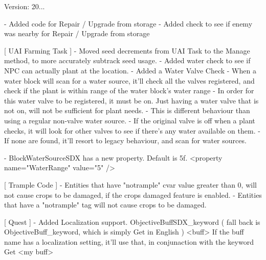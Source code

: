 Version\+: 20... \begin{DoxyVerb}
    - Added code for Repair / Upgrade from storage
    - Added check to see if enemy was nearby for Repair / Upgrade from storage

[ UAI Farming Task ]
    - Moved seed decrements from UAI Task to the Manage method, to more accurately subtrack seed usage.
    - Added water check to see if NPC can actually plant at the location.
    - Added a Water Valve Check
        - When a water block will scan for a water source, it'll check all the valves registered, and check if the plant is within range of the water block's water range
        - In order for this water valve to be registered, it must be on. Just having a water valve that is not on, will not be sufficient for plant needs.
                - This is different behaviour than using a regular non-valve water source.
        - If the original valve is off when a plant checks, it will look for other valves to see if there's any water available on them.
        - If none are found, it'll resort to legacy behaviour, and scan for water sources.

        - BlockWaterSourceSDX has a new property. Default is 5f.
            <property name="WaterRange" value="5" />


[ Trample Code ]
    - Entities that have "notrample" cvar value greater than 0, will not cause crops to be damaged, if the crops damaged feature is enabled.
    - Entities that have a "notrample" tag will not cause crops to be damaged.

[ Quest ]
    - Added Localization support.
        ObjectiveBuffSDX_keyword  ( fall back is ObjectiveBuff_keyword, which is simply Get in English )
        <buff> If the buff name has a localization setting, it'll use that, in conjunaction with the keyword  Get <my buff>
\end{DoxyVerb}
